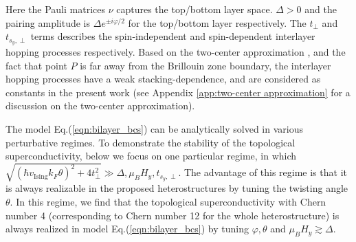 Here the Pauli matrices $\nu$ captures the top/bottom layer space. $\Delta>0$ and the pairing amplitude is $\Delta e^{\pm i\varphi/2}$ for the top/bottom layer respectively. The $t_\perp$ and $t_{s_y,\perp}$ terms describes the spin-independent and spin-dependent interlayer hopping processes respectively. Based on the two-center approximation \cite{bistritzer2011moire,devakul2021magic}, and the fact that point $P$ is far away from the Brillouin zone boundary, the interlayer hopping processes have a weak stacking-dependence, and are considered as constants in the present work \cite{volkov2020magic,volkov2021josephson} (see Appendix \ref{app:two-center approximation} for a discussion on the two-center approximation).


The model Eq.(\ref{eqn:bilayer_bcs}) can be analytically solved in various perturbative regimes. To demonstrate the stability of the topological superconductivity, below we focus on one particular regime, in which $\sqrt{(\hbar v_{\text{Ising}} k_F\theta)^2+4t_\perp^2}\gg \Delta,\mu_B H_y, t_{s_y,\perp}$. The advantage of this regime is that it is always realizable in the proposed heterostructures by tuning the twisting angle $\theta$. In this regime, we find that the topological superconductivity with Chern number 4 (corresponding to Chern number 12 for the whole heterostructure) is always realized in model Eq.(\ref{eqn:bilayer_bcs}) by tuning $\varphi,\theta$ and $\mu_B H_y \gtrsim  \Delta$.

